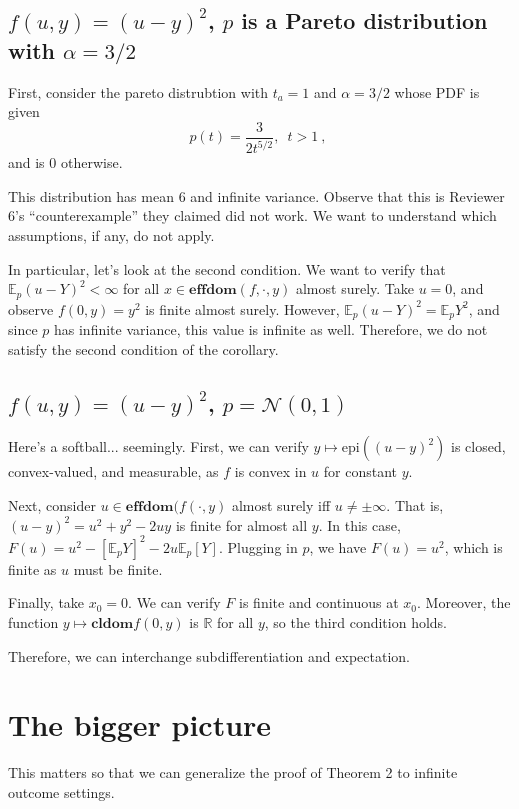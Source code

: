 \documentclass[12pt]{article}
\newcommand{\reals}{\mathbb{R}}
\newcommand{\E}{\mathbb{E}}
\newcommand{\cl}{\mathbf{cl}}
\newcommand{\dom}{\mathbf{dom}}
\newcommand{\effdom}{\mathbf{effdom}}
\newcommand{\epi}{\mathrm{epi}}
\begin{document}
\subsection{$f(u,y) = (u-y)^2$, $p$ is a Pareto distribution with $\alpha = 3/2$}
First, consider the pareto distrubtion with $t_a = 1$ and $\alpha = 3/2$ whose PDF is given 
\begin{equation*}
p(t) = \frac{3}{2t^{5/2}}, \,\,\, t > 1~,~
\end{equation*}
and is $0$ otherwise.

This distribution has mean $6$ and infinite variance.
Observe that this is Reviewer 6's ``counterexample'' they claimed did not work.
We want to understand which assumptions, if any, do not apply.

In particular, let's look at the second condition.
We want to verify that $\E_p (u-Y)^2 < \infty$ for all $x \in \effdom (f, \cdot, y)$ almost surely.
Take $u = 0$, and observe $f(0,y) = y^2$ is finite almost surely. 
However, $\E_p (u-Y)^2 = \E_p Y^2$, and since $p$ has infinite variance, this value is infinite as well.
Therefore, we do not satisfy the second condition of the corollary.


\subsection{$f(u,y) = (u-y)^2$, $p = \mathcal{N}(0,1)$}
Here's a softball... seemingly.
First, we can verify $y \mapsto \epi((u-y)^2)$ is closed, convex-valued, and measurable, as $f$ is convex in $u$ for constant $y$.

Next, consider $u \in \effdom(f(\cdot, y)$ almost surely iff $u \neq \pm \infty$.
That is, $(u - y)^2 = u^2 + y^2 - 2uy$ is finite for almost all $y$.
In this case, $F(u) = u^2 - [\E_p Y]^2 -2 u \E_p [Y]$.
Plugging in $p$, we have $F(u) = u^2$, which is finite as $u$ must be finite.

Finally, take $x_0 = 0$.
We can verify $F$ is finite and continuous at $x_0$.
Moreover, the function $y \mapsto \cl \dom f(0, y)$ is $\reals$ for all $y$, so the third condition holds.

Therefore, we can interchange subdifferentiation and expectation. 


\section{The bigger picture}
This matters so that we can generalize the proof of Theorem 2 to infinite outcome settings.
\end{document}
